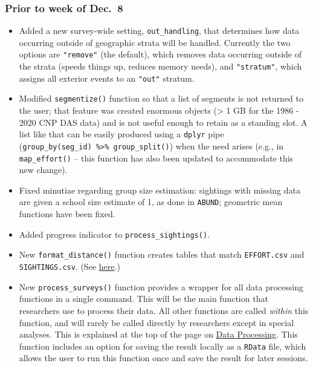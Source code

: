 \documentclass[
]{book}
\begin{document}
\hypertarget{prior-to-week-of-dec.-8}{%
\subsubsection*{Prior to week of Dec.~8}\label{prior-to-week-of-dec.-8}}

\begin{itemize}
\item
  Added a new survey-wide setting, \texttt{out\_handling}, that determines how data occurring outside of geographic strata will be handled. Currently the two options are \texttt{"remove"} (the default), which removes data occurring outside of the strata (speeds things up, reduces memory needs), and \texttt{"stratum"}, which assigns all exterior events to an \texttt{"out"} stratum.
\item
  Modified \texttt{segmentize()} function so that a list of segments is not returned to the user; that feature was created enormous objects (\textgreater{} 1 GB for the 1986 - 2020 CNP DAS data) and is not useful enough to retain as a standing slot. A list like that can be easily produced using a \texttt{dplyr} pipe (\texttt{group\_by(seg\_id)\ \%\textgreater{}\%\ group\_split()}) when the need arises (e.g., in \texttt{map\_effort()} -- this function has also been updated to accommodate this new change).
\item
  Fixed minutiae regarding group size estimation: sightings with missing data are given a school size estimate of 1, as done in \texttt{ABUND}; geometric mean functions have been fixed.
\item
  Added progress indicator to \texttt{process\_sightings()}.
\item
  New \texttt{format\_distance()} function creates tables that match \texttt{EFFORT.csv} and \texttt{SIGHTINGS.csv}. (See \protect\hyperlink{df}{here}.)
\item
  New \texttt{process\_surveys()} function provides a wrapper for all data processing functions in a single command. This will be the main function that researchers use to process their data. All other functions are called \emph{within} this function, and will rarely be called directly by researchers except in special analyses. This is explained at the top of the page on \protect\hyperlink{processing}{Data Processing}. This function includes an option for saving the result locally as a \texttt{RData} file, which allows the user to run this function once and save the result for later sessions.

\end{itemize}
\end{document}
